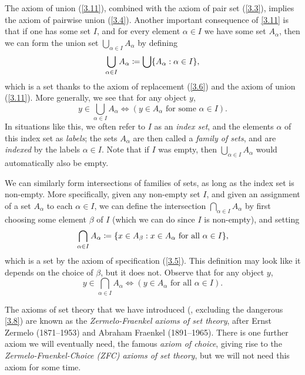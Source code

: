 \begin{note}
  The axiom of union (\cref{3.11}), combined with the axiom of pair set (\cref{3.3}), implies the axiom of pairwise union (\cref{3.4}).
  Another important consequence of \cref{3.11} is that if one has some set \(I\), and for every element \(\alpha \in I\) we have some set \(A_{\alpha}\), then we can form the union set \(\bigcup_{\alpha \in I} A_{\alpha}\) by defining
  \[
    \bigcup_{\alpha \in I} A_{\alpha} \coloneqq \bigcup \set{A_{\alpha} : \alpha \in I},
  \]
  which is a set thanks to the axiom of replacement (\cref{3.6}) and the axiom of union (\cref{3.11}).
  More generally, we see that for any object \(y\),
  \[
    y \in \bigcup_{\alpha \in I} A_{\alpha} \iff (y \in A_{\alpha} \text{ for some } \alpha \in I).
  \]
  In situations like this, we often refer to \(I\) as an \emph{index set}, and the elements \(\alpha\) of this index set as \emph{labels};
  the sets \(A_{\alpha}\) are then called a \emph{family of sets}, and are \emph{indexed} by the labels \(\alpha \in I\).
  Note that if \(I\) was empty, then \(\bigcup_{\alpha \in I} A_{\alpha}\) would automatically also be empty.
\end{note}

\begin{note}
  We can similarly form intersections of families of sets, as long as the index set is non-empty.
  More specifically, given any non-empty set \(I\), and given an assignment of a set \(A_{\alpha}\) to each \(\alpha \in I\), we can define the intersection \(\bigcap_{\alpha \in I} A_{\alpha}\) by first choosing some element \(\beta\) of \(I\) (which we can do since \(I\) is non-empty), and setting
  \[
    \bigcap_{\alpha \in I} A_{\alpha} \coloneqq \set{x \in A_{\beta} : x \in A_{\alpha} \text{ for all } \alpha \in I},
  \]
  which is a set by the axiom of specification (\cref{3.5}).
  This definition may look like it depends on the choice of \(\beta\), but it does not.
  Observe that for any object \(y\),
  \[
    y \in \bigcap_{\alpha \in I} A_{\alpha} \iff (y \in A_{\alpha} \text{ for all } \alpha \in I).
  \]
\end{note}

\setcounter{thm}{11}
\begin{rmk}\label{3.4.12}
  The axioms of set theory that we have introduced (, excluding the dangerous \cref{3.8}) are known as the \emph{Zermelo-Fraenkel axioms of set theory}, after Ernst Zermelo (1871--1953) and Abraham Fraenkel (1891--1965).
  There is one further axiom we will eventually need, the famous \emph{axiom of choice}, giving rise to the \emph{Zermelo-Fraenkel-Choice (ZFC) axioms of set theory}, but we will not need this axiom for some time.
\end{rmk}

